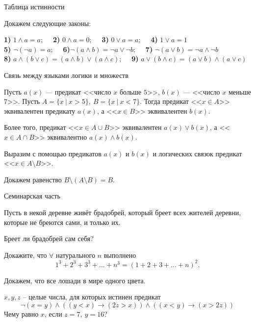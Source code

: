 \begin{frame}{Таблица истинности}


\exmpl Докажем следующие законы:

{\bf 1)} $1 \wedge a=a ; \quad$ {\bf 2)} $0 \wedge a=0 ; \quad$ {\bf 3)} $0 \vee a=a; \quad$
{\bf 4)} $1 \vee a=1$\\
{\bf 5)} $ \neg(\neg a)=a ; \quad $ {\bf 6)}$ \neg(a \wedge b)=\neg a \vee \neg b ; \quad$ {\bf 7)} $ \neg(a \vee b)=\neg a \wedge \neg b$\\
{\bf 8)} $a \wedge(b \vee c)=(a \wedge b) \vee(a \wedge c) ; \quad$ {\bf 9)} $a \vee(b \wedge c)=(a \vee b) \wedge(a \vee c)$

\end{frame}

\begin{frame}{Связь между языками логики и множеств}

Пусть $a(x)$ --- предикат <<число $x$ больше $5$>>, $b(x)$ --- <<число $x$ меньше $7$>>. Пусть $A= \{ x\ |\ x>5\},\ B= \{ x\ |\ x<7\}.$ Тогда предикат <<$x \in A$>> эквивалентен предикату $a(x)$, а <<$x \in B$>> эквивалентен $b(x)$.

Более того, предикат <<$x \in A\cup B$>> эквивалентен $a(x)\vee b(x)$, а <<$x \in A\cap B$>> эквивалентно $a(x)\wedge b(x)$.

\exmpl Выразим с помощью предикатов $a(x)$ и $b(x)$ и логических
связок предикат <<$x \in A\setminus B$>>.

\exmpl Докажем равенство $B\setminus (A \setminus B)=B.$

\end{frame}

\begin{frame}{Семинарская часть}

\z Пусть в некой деревне живёт брадобрей, который бреет всех жителей деревни, которые не бреются сами, и только их.

Бреет ли брадобрей сам себя?

\zh Докажите, что $\forall$ натурального $n$ выполнено $$1^3+2^3+3^3+\dots +n^3=(1+2+3+\dots +n)^2.$$

\z Докажем, что все лошади в мире одного цвета.

\z $x,y,z$ – целые числа, для которых истинен предикат
$$\neg(x=y) \wedge((y<x) \rightarrow(2 z>x)) \wedge((x<y) \rightarrow(x>2 z))$$
Чему равно $x$, если $z = 7,\ y = 16$?

\end{frame}


